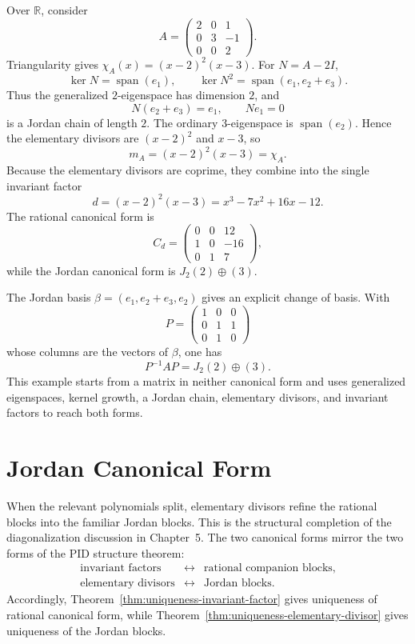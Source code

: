 \begin{example}
Over \(\mathbb R\), consider
\[
A=\begin{pmatrix}2&0&1\\0&3&-1\\0&0&2\end{pmatrix}.
\]
Triangularity gives \(\chi_A(x)=(x-2)^2(x-3)\).  For \(N=A-2I\),
\[
\ker N=\operatorname{span}(e_1),
\qquad
\ker N^2=\operatorname{span}(e_1,e_2+e_3).
\]
Thus the generalized \(2\)-eigenspace has dimension \(2\), and
\[
N(e_2+e_3)=e_1,\qquad Ne_1=0
\]
is a Jordan chain of length \(2\).  The ordinary \(3\)-eigenspace is
\(\operatorname{span}(e_2)\).  Hence the elementary divisors are
\((x-2)^2\) and \(x-3\), so
\[
m_A=(x-2)^2(x-3)=\chi_A.
\]
Because the elementary divisors are coprime, they combine into the single
invariant factor
\[
d=(x-2)^2(x-3)=x^3-7x^2+16x-12.
\]
The rational canonical form is
\[
C_d=\begin{pmatrix}0&0&12\\1&0&-16\\0&1&7\end{pmatrix},
\]
while the Jordan canonical form is \(J_2(2)\oplus(3)\).

The Jordan basis \(\beta=(e_1,e_2+e_3,e_2)\) gives an explicit change of
basis.  With
\[
P=\begin{pmatrix}1&0&0\\0&1&1\\0&1&0\end{pmatrix}
\]
whose columns are the vectors of \(\beta\), one has
\[
P^{-1}AP=J_2(2)\oplus(3).
\]
This example starts from a matrix in neither canonical form and uses
generalized eigenspaces, kernel growth, a Jordan chain, elementary divisors,
and invariant factors to reach both forms.
\end{example}

\section{Jordan Canonical Form}
When the relevant polynomials split, elementary divisors refine the rational
blocks into the familiar Jordan blocks. This is the structural completion of
the diagonalization discussion in Chapter~5. The two canonical forms mirror
the two forms of the PID structure theorem:
\[
\begin{array}{ccl}
\text{invariant factors}&\longleftrightarrow&\text{rational companion blocks},\\
\text{elementary divisors}&\longleftrightarrow&\text{Jordan blocks}.
\end{array}
\]
Accordingly, Theorem~\ref{thm:uniqueness-invariant-factor} gives uniqueness
of rational canonical form, while
Theorem~\ref{thm:uniqueness-elementary-divisor} gives uniqueness of the
Jordan blocks.

